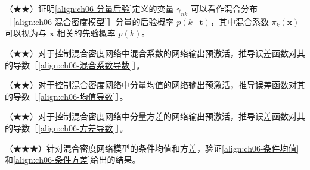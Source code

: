 \documentclass[../../main.tex]{subfiles}
\begin{document}
\begin{exercise}\label{exercise:ch06-17}
（★★）证明\eqref{align:ch06-分量后验}定义的变量 $\gamma_{nk}$ 可以看作混合分布［\eqref{align:ch06-混合密度模型}］分量的后验概率 $p(k\mid\boldsymbol{t})$，其中混合系数 $\pi_k(\boldsymbol{x})$ 可以视为与 $\boldsymbol{x}$ 相关的先验概率 $p(k)$。
\end{exercise}

\begin{exercise}\label{exercise:ch06-18}
（★★）对于控制混合密度网络中混合系数的网络输出预激活，推导误差函数对其的导数［\eqref{align:ch06-混合系数导数}］。
\end{exercise}

\begin{exercise}\label{exercise:ch06-19}
（★★）对于控制混合密度网络中分量均值的网络输出预激活，推导误差函数对其的导数［\eqref{align:ch06-均值导数}］。
\end{exercise}

\begin{exercise}\label{exercise:ch06-20}
（★★）对于控制混合密度网络中分量方差的网络输出预激活，推导误差函数对其的导数［\eqref{align:ch06-方差导数}］。
\end{exercise}

\begin{exercise}\label{exercise:ch06-21}
（★★★）针对混合密度网络模型的条件均值和方差，验证\eqref{align:ch06-条件均值}和\eqref{align:ch06-条件方差}给出的结果。
\end{exercise}
\end{document}
